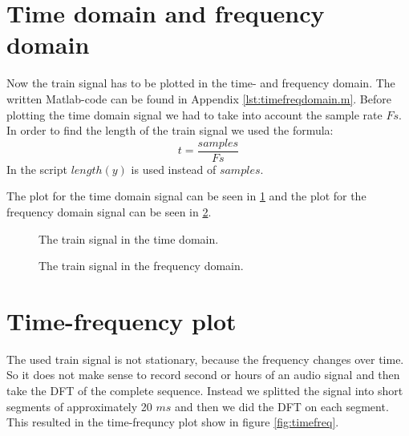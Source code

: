 \documentclass[final]{scrreprt} %
\begin{document}
\section{Time domain and frequency domain}
Now the train signal has to be plotted in the time- and frequency domain.
The written Matlab-code can be found in Appendix \ref{lst:timefreqdomain.m}.
Before plotting the time domain signal we had to take into account the sample rate $Fs$.
In order to find the length of the train signal we used the formula:
\begin{equation}
t = \frac{samples}{Fs}
\end{equation}
In the script $length(y)$ is used instead of $samples$.

The plot for the time domain signal can be seen in \ref{fig:timedomain} and the plot for the frequency domain signal can be seen in \ref{fig:freqdomain}.


\begin{figure}[H]
	\centering
	\setlength\figureheight{6cm}
    	\setlength\figurewidth{10cm}
	
	\caption{The train signal in the time domain.}
	\label{fig:timedomain}
\end{figure}



\begin{figure}[H]
	\centering
	\setlength\figureheight{6cm}
  	\setlength\figurewidth{10cm}
	
	\caption{The train signal in the frequency domain.}
	\label{fig:freqdomain}
\end{figure}

\section{Time-frequency plot}
The used train signal is not stationary, because the frequency changes over time. 
So it does not make sense to record second or hours of an audio signal and then take the DFT of the complete sequence. 
Instead we splitted the signal into short segments of approximately 20 $ms$ and then we did the DFT on each segment. 
This resulted in the time-frequncy plot show in figure \ref{fig:timefreq}.
\end{document}
